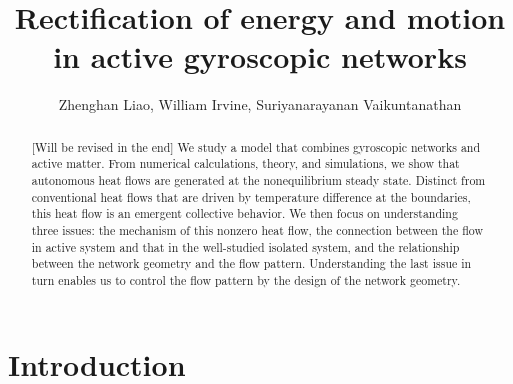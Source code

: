 \documentclass[
 preprint,
 preprintnumbers,
 amsmath,amssymb,
 aps,
 pre,
 longbibliography,
 10pt, twocolumn
]{revtex4-1}
\begin{document}
\newcommand{\eqnname}{Eqn.}
\newcommand{\secname}{Sec.}


\title{Rectification of energy and motion in active gyroscopic networks}

\author{Zhenghan Liao, William Irvine, Suriyanarayanan Vaikuntanathan}


\begin{abstract}
[Will be revised in the end] We study a model that combines gyroscopic networks and active matter. From numerical calculations, theory, and simulations, we show that autonomous heat flows are generated at the nonequilibrium steady state. Distinct from conventional heat flows that are driven by temperature difference at the boundaries, this heat flow is an emergent collective behavior. 
We then focus on understanding three issues: the mechanism of this nonzero heat flow, the connection between the flow in active system and that in the well-studied isolated system, and the relationship between the network geometry and the flow pattern. 
Understanding the last issue in turn enables us to control the flow pattern by the design of the network geometry.
\end{abstract}


\maketitle



\section{Introduction} \label{sec:intro}
\end{document}
